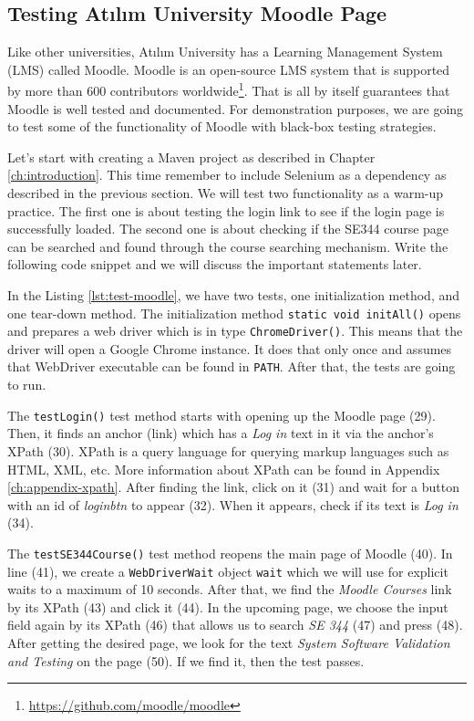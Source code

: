 \subsection{Testing Atılım University Moodle Page}
Like other universities, Atılım University has a Learning Management System (LMS) called Moodle. Moodle is an open-source LMS system that is supported by more than 600 contributors worldwide\footnote{\url{https://github.com/moodle/moodle}}. That is all by itself guarantees that Moodle is well tested and documented. For demonstration purposes, we are going to test some of the functionality of Moodle with black-box testing strategies.

Let's start with creating a Maven project as described in Chapter \ref{ch:introduction}. This time remember to include Selenium as a dependency as described in the previous section. We will test two functionality as a warm-up practice. The first one is about testing the login link to see if the login page is successfully loaded. The second one is about checking if the SE344 course page can be searched and found through the course searching mechanism. Write the following code snippet and we will discuss the important statements later.



In the Listing \ref{lst:test-moodle}, we have two tests, one initialization method, and one tear-down method. The initialization method \lstinline!static void initAll()! opens and prepares a web driver which is in type \lstinline!ChromeDriver()!. This means that the driver will open a Google Chrome instance. It does that only once and assumes that WebDriver executable can be found in \lstinline[language={}]!PATH!. After that, the tests are going to run.

The \lstinline!testLogin()! test method starts with opening up the Moodle page (29). Then, it finds an anchor (link) which has a \emph{Log in} text in it via the anchor's XPath (30). XPath is a query language for querying markup languages such as HTML, XML, etc. More information about XPath can be found in Appendix \ref{ch:appendix-xpath}. After finding the link, click on it (31) and wait for a button with an id of \emph{loginbtn} to appear (32). When it appears, check if its text is \emph{Log in} (34).

The \lstinline!testSE344Course()! test method reopens the main page of Moodle (40). In line (41), we create a \lstinline!WebDriverWait! object \lstinline!wait! which we will use for explicit waits to a maximum of 10 seconds. After that, we find the \emph{Moodle Courses} link by its XPath (43) and click it (44). In the upcoming page, we choose the input field again by its XPath (46) that allows us to search \emph{SE 344} (47) and press \keys{\return} (48). After getting the desired page, we look for the text \emph{System Software Validation and Testing} on the page (50). If we find it, then the test passes.

